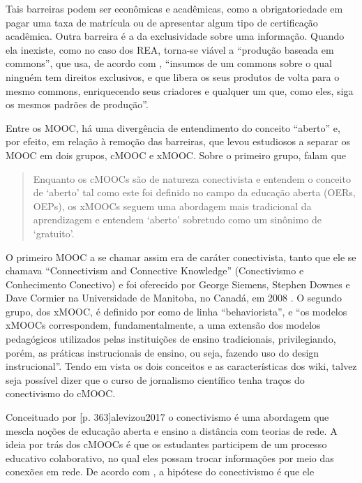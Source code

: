 \documentclass{textolivre}
\begin{document}
Tais barreiras podem ser econômicas e acadêmicas, como a obrigatoriedade em pagar uma taxa de matrícula ou de apresentar algum tipo de certificação acadêmica. Outra barreira é a da exclusividade sobre uma informação. Quando ela inexiste, como no caso dos REA, torna-se viável a “produção baseada em commons”, que usa, de acordo com \textcite[p. 18]{benkler2009}, “insumos de um commons sobre o qual ninguém tem direitos exclusivos, e que libera os seus produtos de volta para o mesmo commons, enriquecendo seus criadores e qualquer um que, como eles, siga os mesmos padrões de produção”. 

Entre os MOOC, há uma divergência de entendimento do conceito “aberto” e, por efeito, em relação à remoção das barreiras, que levou estudiosos a separar os MOOC em dois grupos, cMOOC e xMOOC. Sobre o primeiro grupo, \textcite[p. 6]{teixeira2015} falam que

\begin{quote}
Enquanto os cMOOCs são de natureza conectivista e entendem o conceito de ‘aberto’ tal como este foi definido no campo da educação aberta (OERs, OEPs), os xMOOCs seguem uma abordagem mais tradicional da aprendizagem e entendem ‘aberto’ sobretudo como um sinônimo de ‘gratuito’.
\end{quote}
	
O primeiro MOOC a se chamar assim era de caráter conectivista, tanto que ele se chamava “Connectivism and Connective Knowledge” (Conectivismo e Conhecimento Conectivo) e foi oferecido por George Siemens, Stephen Downes e Dave Cormier na Universidade de Manitoba, no Canadá, em 2008 \cite[p. 5]{teixeira2015}. O segundo grupo, dos xMOOC, é definido por \textcite[p. 185]{forno2013} como de linha “behaviorista”, e “os modelos xMOOCs correspondem, fundamentalmente, a uma extensão dos modelos pedagógicos utilizados pelas instituições de ensino tradicionais, privilegiando, porém, as práticas instrucionais de ensino, ou seja, fazendo uso do design instrucional”. Tendo em vista os dois conceitos e as características dos wiki, talvez seja possível dizer que o curso de jornalismo científico tenha traços do conectivismo do cMOOC.

Conceituado por [p. 363]{alevizou2017} o conectivismo é uma abordagem que mescla noções de educação aberta e ensino a distância com teorias de rede. A ideia por trás dos cMOOCs é que os estudantes participem de um processo educativo colaborativo, no qual eles possam trocar informações por meio das conexões em rede. De acordo com \textcite[p. 365]{alevizou2017}, a hipótese do conectivismo é que ele 
\end{document}
